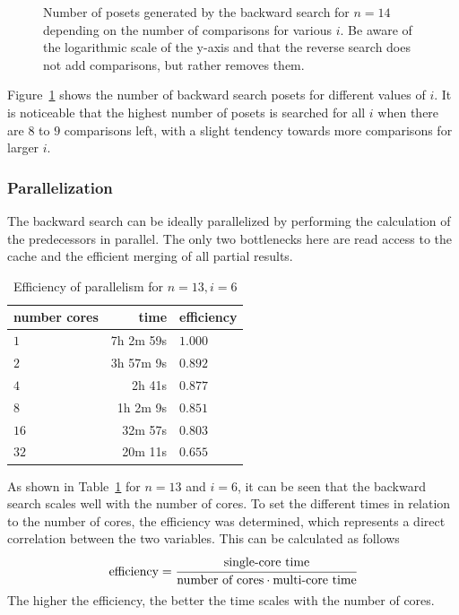 \documentclass[twoside,leqno,twocolumn]{article}
\begin{document}
\begin{figure}[!b]
  \centering
  
  \caption{Number of posets generated by the backward search for $n = 14$ depending on the number of comparisons for various $i$. Be aware of the logarithmic scale of the y-axis and that the reverse search does not add comparisons, but rather removes them.}
  \label{fig:backward-posets-per-level}
\end{figure}

Figure~\ref{fig:backward-posets-per-level} shows the number of backward search posets for different values of $i$.
It is noticeable that the highest number of posets is searched for all $i$ when there are $8$ to $9$ comparisons left, with a slight tendency towards more comparisons for larger $i$.


\subsubsection{Parallelization} \label{sec:backward:parallelisation}

The backward search can be ideally parallelized by performing the calculation of the predecessors in parallel.
The only two bottlenecks here are read access to the cache and the efficient merging of all partial results.

\begin{table}[!t]
  \renewcommand{\arraystretch}{1.2}
  \caption{Efficiency of parallelism for $n = 13, i = 6$}
  \label{table:backward-parallel}
  \centering
  \begin{tabular}{l|r|l}
    \textbf{number cores} & \textbf{time} & \textbf{efficiency} \\
    \hline
    $1$                   & 7h 2m 59s     & $1.000$             \\
    $2$                   & 3h 57m 9s     & $0.892$             \\
    $4$                   & 2h 41s        & $0.877$             \\
    $8$                   & 1h 2m 9s      & $0.851$             \\
    $16$                  & 32m 57s       & $0.803$             \\
    $32$                  & 20m 11s       & $0.655$             \\
  \end{tabular}
\end{table}

As shown in Table~\ref{table:backward-parallel} for $n = 13$ and $i = 6$, it can be seen that the backward search scales well with the number of cores.
To set the different times in relation to the number of cores, the efficiency was determined, which represents a direct correlation between the two variables.
This can be calculated as follows
\[
  \text{efficiency} = \cfrac{\text{single-core time}}{\text{number of cores} \cdot \text{multi-core time}}
\]
The higher the efficiency, the better the time scales with the number of cores.
\end{document}
